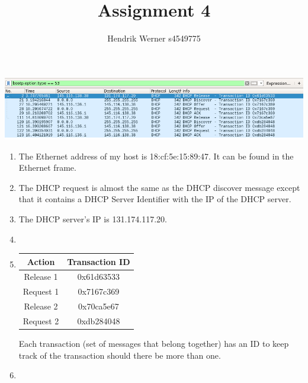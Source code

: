 \documentclass[12pt, a4paper]{article}
\title{Assignment 4}
\author{Hendrik Werner s4549775}
\begin{document}
\maketitle

\section{} %
\includegraphics[width=\linewidth]{screenshots/dhcp}

\begin{enumerate}[a]
	\item %
	The Ethernet address of my host is 18:cf:5e:15:89:47. It can be found in the Ethernet frame.

	\item %
	The DHCP request is almost the same as the DHCP discover message except that it contains a DHCP Server Identifier with the IP of the DHCP server.

	\item %
	The DHCP server's IP is 131.174.117.20.

	\item %
	\item %
	\begin{tabular}{|c|c|}
		\hline
		Action & Transaction ID\\\hline
		Release 1 & 0x61d63533\\\hline
		Request 1 & 0x7167c369\\\hline
		Release 2 & 0x70ca5e67\\\hline
		Request 2 & 0xdb284048\\\hline
	\end{tabular}

	Each transaction (set of messages that belong together) has an ID to keep track of the transaction should there be more than one.

	\item %
\end{enumerate}
\end{document}
